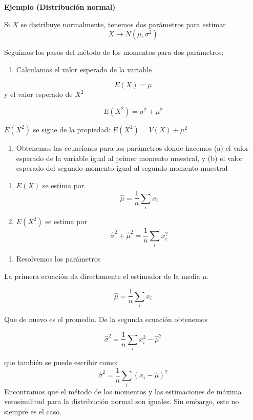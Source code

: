 \documentclass[
]{book}
\providecommand{\tightlist}{%
  \setlength{\itemsep}{0pt}\setlength{\parskip}{0pt}}
\begin{document}
\textbf{Ejemplo (Distribución normal)}

Si \(X\) se distribuye normalmente, tenemos dos parámetros para estimar
\[X \rightarrow N(\mu, \sigma^2)\]

Seguimos los pasos del método de los momentos para dos parámetros:

\begin{enumerate}
\def\labelenumi{\arabic{enumi}.}
\tightlist
\item
  Calculamos el valor esperado de la variable
\end{enumerate}

\[E(X)=\mu\]
y el valor esperado de \(X^2\)

\[E(X^2)=\sigma^2+\mu^2\]

\(E(X^2)\) se sigue de la propiedad: \(E(X^2) = V(X)+\mu^2\)

\begin{enumerate}
\def\labelenumi{\arabic{enumi}.}
\setcounter{enumi}{1}
\tightlist
\item
  Obtenemos las ecuaciones para los parámetros donde hacemos (a) el valor esperado de la variable igual al primer momento muestral, y (b) el valor esperado del segundo momento igual al segundo momento muestral
\end{enumerate}

\begin{enumerate}
\def\labelenumi{\alph{enumi}.}
\tightlist
\item
  \(E(X)\) se estima por \[\hat{\mu}=\frac{1}{n}\sum_i x_i\]
\item
  \(E(X^2)\) se estima por \[\hat{\sigma}^2+\hat{\mu}^2=\frac{1}{n}\sum_i x^2_i\]
\end{enumerate}

\begin{enumerate}
\def\labelenumi{\arabic{enumi}.}
\setcounter{enumi}{2}
\tightlist
\item
  Resolvemos los parámetros
\end{enumerate}

La primera ecuación da directamente el estimador de la media \(\mu\).

\[\hat{\mu}=\frac{1}{n}\sum_i x_i\]

Que de nuevo es el promedio. De la segunda ecuación obtenemos

\[\hat{\sigma}^2= \frac{1}{n} \sum_i x^2_i-\hat{\mu}^2\]

que también se puede escribir como:
\[\hat{\sigma}^2=\frac{1}{n} \sum_i(x_i-\hat{\mu})^2\]
Encontramos que el método de los momentos y las estimaciones de máxima verosimilitud para la distribución normal son iguales. Sin embargo, este no siempre es el caso.
\end{document}
